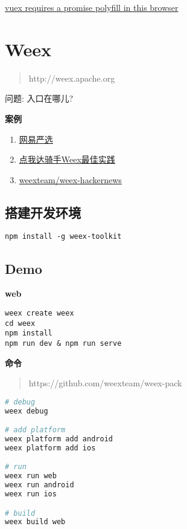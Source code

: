 \href{https://github.com/vuejs-templates/webpack/issues/474}{vuex
requires a promise polyfill in this browser}

\section{Weex}\label{weex}

\begin{quote}
http://weex.apache.org
\end{quote}

问题: 入口在哪儿?

\textbf{案例}

\begin{enumerate}
\def\labelenumi{\arabic{enumi}.}
\tightlist
\item
  \href{https://github.com/zwwill/yanxuan-weex-demo}{网易严选}
\item
  \href{https://mp.weixin.qq.com/s/dowOE_QpZrtV5GH9EAgyHg}{点我达骑手Weex最佳实践}
\item
  \href{https://github.com/weexteam/weex-hackernews}{weexteam/weex-hackernews}
\end{enumerate}

\subsection{搭建开发环境}\label{ux642dux5efaux5f00ux53d1ux73afux5883}

\begin{lstlisting}
npm install -g weex-toolkit
\end{lstlisting}

\subsection{Demo}\label{demo-2}

\textbf{web}

\begin{lstlisting}
weex create weex
cd weex
npm install
npm run dev & npm run serve
\end{lstlisting}

\textbf{命令}

\begin{quote}
https://github.com/weexteam/weex-pack
\end{quote}

\begin{lstlisting}[language=bash]
# debug
weex debug

# add platform
weex platform add android
weex platform add ios

# run
weex run web
weex run android
weex run ios

# build
weex build web
\end{lstlisting}

